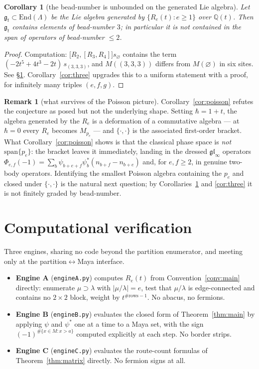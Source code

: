\documentclass[11pt]{article}
\newtheorem{corollary}[theorem]{Corollary}
\theoremstyle{definition}
\newtheorem{remark}[theorem]{Remark}
\newcommand{\Q}{\mathbb{Q}}
\newcommand{\Lam}{\Lambda}
\newcommand{\Mult}[1]{M_{#1}}
\begin{document}
\begin{corollary}[the bead-number is unbounded on the generated Lie algebra]\label{cor:unbdd}
Let $\mathfrak g_t\subset\mathrm{End}(\Lam)$ be the Lie algebra generated by
$\{R_e(t):e\ge1\}$ over $\Q(t)$.  Then $\mathfrak g_t$ contains elements of bead-number
$3$; in particular it is not contained in the span of operators of bead-number $\le2$.
\end{corollary}

\begin{proof}
Computation: $\bigl[R_2,[R_3,R_4]\bigr]s_\varnothing$ contains the term
$(-2t^{5}+4t^{3}-2t)\,s_{(3,3,3)}$, and $M((3,3,3))$ differs from $M(\varnothing)$ in six
sites.  See \S\ref{sec:ver}.  Corollary~\ref{cor:three} upgrades this to a uniform
statement with a proof, for infinitely many triples $(e,f,g)$.
\end{proof}

\begin{remark}[what survives of the Poisson picture]
Corollary~\ref{cor:poisson} refutes the conjecture as posed but not the underlying shape.
Setting $\hbar=1+t$, the algebra generated by the $R_e$ is a deformation of a commutative
algebra --- at $\hbar=0$ every $R_e$ becomes $\Mult{p_e}$ --- and
$\{\cdot,\cdot\}$ is the associated first-order bracket.  What
Corollary~\ref{cor:poisson} shows is that the classical phase space is \emph{not}
$\mathrm{span}\{p_e\}$: the bracket leaves it immediately, landing in the dressed
$\mathfrak{gl}_\infty$ operators
$\Phi_{e,f}(-1)=\sum_b\psi_{b+e+f}\psi_b^{*}(n_{b+f}-n_{b+e})$ and, for $e,f\ge2$, in
genuine two-body operators.  Identifying the smallest Poisson algebra containing the
$p_e$ and closed under $\{\cdot,\cdot\}$ is the natural next question; by
Corollaries~\ref{cor:unbdd} and \ref{cor:three} it is not finitely graded by
bead-number.
\end{remark}

\section{Computational verification}\label{sec:ver}

Three engines, sharing no code beyond the partition enumerator, and meeting only at the
partition$\leftrightarrow$Maya interface.

\begin{itemize}
\item \textbf{Engine A} (\texttt{engineA.py}) computes $R_e(t)$ from
Convention~\ref{conv:main} directly: enumerate $\mu\supset\lambda$ with $|\mu/\lambda|=e$,
test that $\mu/\lambda$ is edge-connected and contains no $2\times2$ block, weight by
$t^{\#\text{rows}-1}$.  No abacus, no fermions.
\item \textbf{Engine B} (\texttt{engineB.py}) evaluates the closed form of
Theorem~\ref{thm:main} by applying $\psi$ and $\psi^{*}$ one at a time to a Maya set, with
the sign $(-1)^{\#\{x\in M:x>a\}}$ computed explicitly at each step.  No border strips.
\item \textbf{Engine C} (\texttt{engineC.py}) evaluates the route-count formulas of
Theorem~\ref{thm:matrix} directly.  No fermion signs at all.
\end{itemize}
\end{document}
